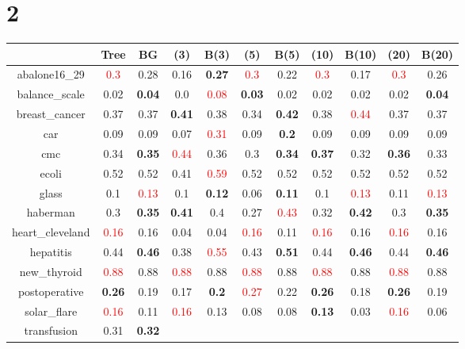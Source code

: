 \documentclass{article}%
\begin{document}
\section*{2}%
\begin{tabular}{c|cccccccccc}%
\hline%
&Tree&BG&(3)&B(3)&(5)&B(5)&(10)&B(10)&(20)&B(20)\\%
\hline%
abalone16\_29&\textcolor{red}{ 
0.3
}&0.28&0.16&\textbf{0.27}&\textcolor{red}{ 
0.3
}&0.22&\textcolor{red}{ 
0.3
}&0.17&\textcolor{red}{ 
0.3
}&0.26\\%
\hline%
balance\_scale&0.02&\textbf{0.04}&0.0&\textcolor{red}{ 
0.08
}&\textbf{0.03}&0.02&0.02&0.02&0.02&\textbf{0.04}\\%
\hline%
breast\_cancer&0.37&0.37&\textbf{0.41}&0.38&0.34&\textbf{0.42}&0.38&\textcolor{red}{ 
0.44
}&0.37&0.37\\%
\hline%
car&0.09&0.09&0.07&\textcolor{red}{ 
0.31
}&0.09&\textbf{0.2}&0.09&0.09&0.09&0.09\\%
\hline%
cmc&0.34&\textbf{0.35}&\textcolor{red}{ 
0.44
}&0.36&0.3&\textbf{0.34}&\textbf{0.37}&0.32&\textbf{0.36}&0.33\\%
\hline%
ecoli&0.52&0.52&0.41&\textcolor{red}{ 
0.59
}&0.52&0.52&0.52&0.52&0.52&0.52\\%
\hline%
glass&0.1&\textcolor{red}{ 
0.13
}&0.1&\textbf{0.12}&0.06&\textbf{0.11}&0.1&\textcolor{red}{ 
0.13
}&0.11&\textcolor{red}{ 
0.13
}\\%
\hline%
haberman&0.3&\textbf{0.35}&\textbf{0.41}&0.4&0.27&\textcolor{red}{ 
0.43
}&0.32&\textbf{0.42}&0.3&\textbf{0.35}\\%
\hline%
heart\_cleveland&\textcolor{red}{ 
0.16
}&0.16&0.04&0.04&\textcolor{red}{ 
0.16
}&0.11&\textcolor{red}{ 
0.16
}&0.16&\textcolor{red}{ 
0.16
}&0.16\\%
\hline%
hepatitis&0.44&\textbf{0.46}&0.38&\textcolor{red}{ 
0.55
}&0.43&\textbf{0.51}&0.44&\textbf{0.46}&0.44&\textbf{0.46}\\%
\hline%
new\_thyroid&\textcolor{red}{ 
0.88
}&0.88&\textcolor{red}{ 
0.88
}&0.88&\textcolor{red}{ 
0.88
}&0.88&\textcolor{red}{ 
0.88
}&0.88&\textcolor{red}{ 
0.88
}&0.88\\%
\hline%
postoperative&\textbf{0.26}&0.19&0.17&\textbf{0.2}&\textcolor{red}{ 
0.27
}&0.22&\textbf{0.26}&0.18&\textbf{0.26}&0.19\\%
\hline%
solar\_flare&\textcolor{red}{ 
0.16
}&0.11&\textcolor{red}{ 
0.16
}&0.13&0.08&0.08&\textbf{0.13}&0.03&\textcolor{red}{ 
0.16
}&0.06\\%
\hline%
transfusion&0.31&\textbf{0.32}&\textcolor{red}{ 
}
\end{tabular}
\end{document}
